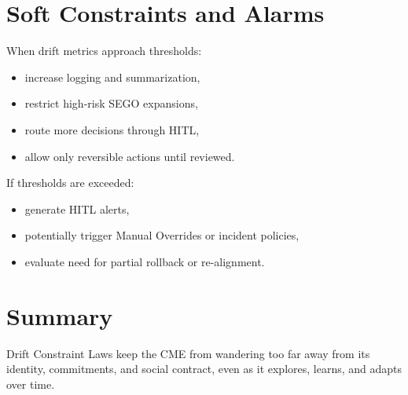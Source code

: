 \section{Soft Constraints and Alarms}

When drift metrics approach thresholds:
\begin{itemize}
    \item increase logging and summarization,
    \item restrict high-risk SEGO expansions,
    \item route more decisions through HITL,
    \item allow only reversible actions until reviewed.
\end{itemize}

If thresholds are exceeded:
\begin{itemize}
    \item generate HITL alerts,
    \item potentially trigger Manual Overrides or incident policies,
    \item evaluate need for partial rollback or re-alignment.
\end{itemize}

\section{Summary}

Drift Constraint Laws keep the CME from wandering too far away from its
identity, commitments, and social contract, even as it explores, learns,
and adapts over time.
